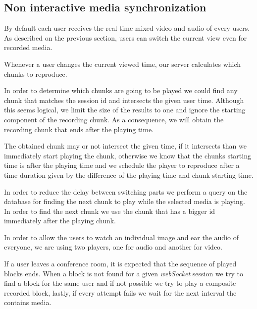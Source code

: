 \subsection{Non interactive media synchronization}
		By default each user receives the real time mixed video and audio of every users. As described on the previous section, users can switch the current view even for recorded media.

		Whenever a user changes the current viewed time, our server calculates which chunks to reproduce.

		In order to determine which chunks are going to be played we could find any chunk that matches the session id and intersects the given user time. Although this seems logical, we limit the size of the results to one and ignore the starting component of the recording chunk. As a consequence, we will obtain the recording chunk that ends after the playing time.

		The obtained chunk may or not intersect the given time, if it intersects than we immediately start playing the chunk, otherwise we know that the chunks starting time is after the playing time and we schedule the player to reproduce after a time duration given by the difference of the playing time and chunk starting time.

		In order to reduce the delay between switching parts we perform a query on the database for finding the next chunk to play while the selected media is playing. In order to find the next chunk we use the chunk that has a bigger id immediately after the playing chunk.

		In order to allow the users to watch an individual image and ear the audio of everyone, we are using two players, one for audio and another for video. 

		If a user leaves a conference room, it is expected that the sequence of played blocks ends. When a block is not found for a given \emph{webSocket} session we try to find a block for the same user and if not possible we try to play a composite recorded block, lastly, if every attempt fails we wait for the next interval the contains media.
